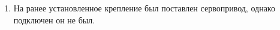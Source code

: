 \begin{enumerate}
\begin{enumerate}
        \item На ранее установленное крепление был поставлен сервопривод, однако подключен он не был.
        \begin{figure}[H]
	  	  \begin{minipage}[h]{0.47\linewidth}
	  	  \end{minipage}
	  	  \hfill
	  	  \begin{minipage}[h]{0.47\linewidth}

\end{minipage}
\end{figure}
\end{enumerate}
\end{enumerate}
